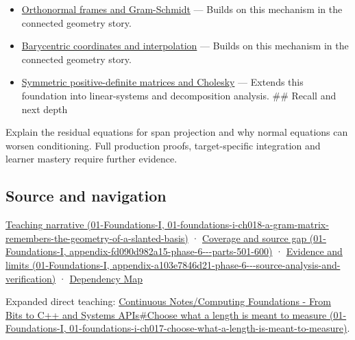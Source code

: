 \begin{itemize}
\tightlist
\item
  \hyperref[appendix-c39f1ed34271]{Orthonormal frames and Gram-Schmidt} --- Builds on this mechanism in the connected geometry story.
\item
  \hyperref[appendix-02b9d9a81dca]{Barycentric coordinates and interpolation} --- Builds on this mechanism in the connected geometry story.
\item
  \hyperref[appendix-50d2ea3c9b26]{Symmetric positive-definite matrices and Cholesky} --- Extends this foundation into linear-systems and decomposition analysis. \#\# Recall and next depth
\end{itemize}

Explain the residual equations for span projection and why normal equations can worsen conditioning. Full production proofs, target-specific integration and learner mastery require further evidence.

\subsection{Source and navigation}\label{appendix-3b863809f82a-source-and-navigation}

\href{../01-Foundations-I/main.pdf\#nameddest=01-foundations-i-ch018-a-gram-matrix-remembers-the-geometry-of-a-slanted-basis}{Teaching narrative (01-Foundations-I, 01-foundations-i-ch018-a-gram-matrix-remembers-the-geometry-of-a-slanted-basis)} · \href{../01-Foundations-I/main.pdf\#nameddest=appendix-fd090d982a15-phase-6---parts-501-600}{Coverage and source gap (01-Foundations-I, appendix-fd090d982a15-phase-6-\/-\/-parts-501-600)} · \href{../01-Foundations-I/main.pdf\#nameddest=appendix-a103e7846d21-phase-6---source-analysis-and-verification}{Evidence and limits (01-Foundations-I, appendix-a103e7846d21-phase-6-\/-\/-source-analysis-and-verification)} · \hyperref[appendix-4ad47bdd269a]{Dependency Map}

Expanded direct teaching: \href{../01-Foundations-I/main.pdf\#nameddest=01-foundations-i-ch017-choose-what-a-length-is-meant-to-measure}{Continuous Notes/Computing Foundations - From Bits to C++ and Systems APIs\#Choose what a length is meant to measure (01-Foundations-I, 01-foundations-i-ch017-choose-what-a-length-is-meant-to-measure)}.
